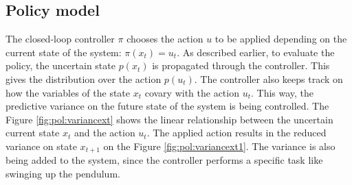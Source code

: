 \subsection{Policy model}
\label{s:pilco:pol}
The closed-loop controller $\pi$ chooses the action $u$ to be applied depending on the current state of the system: $\pi(x_{t})=u_{t}$. As described earlier, to evaluate the policy, the uncertain state $p(x_{t})$ is propagated through the controller. This gives the distribution over the action $p(u_{t})$. The controller also keeps track on how the variables of the state $x_{t}$ covary with the action $u_{t}$. This way, the predictive variance on the future state of the system is being controlled. The Figure \ref{fig:pol:variancext} shows the linear relationship between the uncertain current state $x_{t}$ and the action $u_{t}$. The applied action results in the reduced variance on state $x_{t+1}$ on the Figure \ref{fig:pol:variancext1}. The variance is also being added to the system, since the controller performs a specific task like swinging up the pendulum.

\begin{figure}
    \centering
    \begin{floatrow}
    \end{floatrow}
\end{figure}

